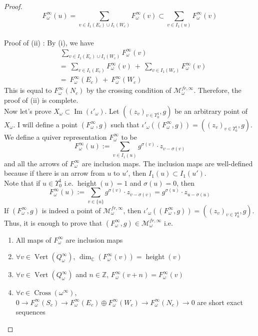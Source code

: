 \begin{proof}
\[
F_\omega^\infty(u) = \sum_{v\in I_1(E_c)\cup I_1(W_c)} F_\omega^\infty(v)\subset \sum_{v\in I_1(u)} F_\omega^\infty(v)
\]\\
Proof of (\Rn{2}) : By (\Rn{1}), we have
\begin{align*}
&~\sum_{v\in I_1(E_c)\cup I_1(W_c)} F_\omega^\infty(v) \\
&=~\sum_{v\in I_1(E_c)} F_\omega^\infty(v)~+~\sum_{v\in I_1(W_c)} F_\omega^\infty(v)\\
&=~F_\omega^\infty(E_c)~+~F_\omega^\infty(W_c)
\end{align*}
This is equal to $F_\omega^\infty(N_c)$ by the crossing condition of $\mathcal{M}_\omega^{fr,\infty}$. Therefore, the proof of (\Rn{2}) is complete.\\
Now let's prove $X_\omega \subset \operatorname{Im}(\iota'_\omega)$. Let $((z_v)_{v\in \Upsilon_0^1},g)$ be an arbitrary point of $X_\omega$. I will define a point $(F_\omega^\infty,g)$ such that $\iota'_\omega((F_\omega^\infty,g))=((z_v)_{v\in \Upsilon_0^1},g)$. We define a quiver representation $F_\omega^\infty$ to be 
\[
F_\omega^\infty(u):=\sum_{v\in I_1(u)}g^{\sigma(v)}\cdot z_{v-\sigma(v)}
\]
and all the arrows of $F_\omega^\infty$ are inclusion maps. The inclusion maps are well-defined because if there is an arrow from $u$ to $u'$, then $I_1(u)\subset I_1(u')$.\\
Note that if $u\in\Upsilon_0^1$ i.e. $\operatorname{height}(u)=1$ and $\sigma(u) = 0$, then 
\[
F_\omega^\infty(u):=\sum_{v\in \{u\}}g^{\sigma(v)}\cdot z_{v-\sigma(v)} = g^{\sigma(u)}\cdot z_{u-\sigma(u)} 
\]
If $(F_\omega^\infty ,g)$ is indeed a point of $\mathcal{M}_\omega^{fr,\infty}$, then $\iota'_\omega ((F_\omega^\infty,g)) = ((z_v)_{v\in\Upsilon_0^1},g)$. Thus, it is enough to prove that $(F_\omega^\infty,g)\in\mathcal{M}_\omega^{fr,\infty}$ i.e.
\begin{enumerate}[label = (\roman*)]
\item All maps of $F_\omega^\infty$ are inclusion maps
\item $\forall v\in \operatorname{Vert}(Q_\omega^\infty)$, $\operatorname{dim}_\mathbb{C}(F_\omega^\infty(v)) = \operatorname{height}(v)$
\item $\forall v\in \operatorname{Vert}(Q_\omega^\infty)$ and $n\in \mathbb{Z}$, $F_\omega^\infty(v+n) = F_\omega^\infty(v)$
\item $\forall c\in \operatorname{Cross}(\omega^\infty)$, $0\rightarrow F_\omega^\infty(S_c)\rightarrow F_\omega^\infty(E_c)\oplus F_\omega^\infty(W_c)\rightarrow F_\omega^\infty(N_c)\rightarrow 0$ are short exact sequences

\end{enumerate}
\end{proof}
